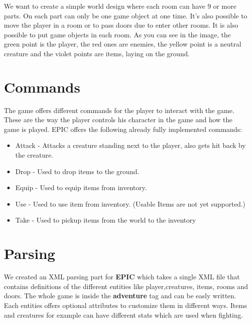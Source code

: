 We want to create a simple world design where each room can have 9 or more parts. On each part can only be one game object at one time. It's also possible to move the player in a room or to pass doors due to enter other rooms. It is also possible to put game objects in each room. As you can see in the image, the green point is the player, the red ones are enemies, the yellow point is a neutral creature and the violet points are items, laying on the ground.

\section{Commands}
The game offers different commands for the player to interact with the game. These are the way the player controls his character in the game and how the game is played.
EPIC offers the following already fully implemented commands:
\begin{itemize}
\item Attack - Attacks a creature standing next to the player, also gets hit back by the creature.
\item Drop - Used to drop items to the ground.
\item Equip - Used to equip items from inventory.
\item Use - Used to use item from inventory. (Usable Items are not yet supported.)
\item Take - Used to pickup items from the world to the inventory
\end{itemize}

\section{Parsing}

We created an XML parsing part for \textbf{EPIC} which takes a single XML file that contains definitions of the different entities like player,creatures, items, rooms and doors. The whole game is inside the \textbf{adventure} tag and can be easly written. Each entities offers optional attributes to customize them in different ways.  Items and creatures for example can have different stats which are used when fighting.